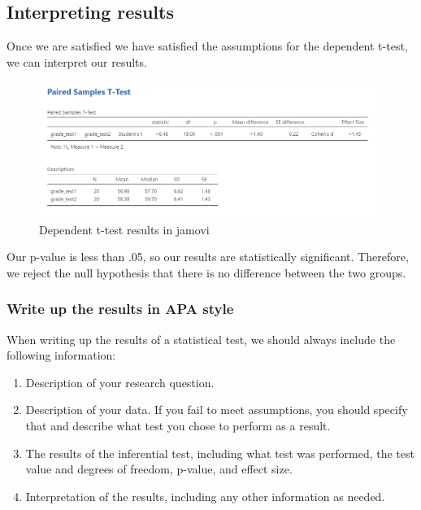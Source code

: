 \documentclass[
]{book}
\providecommand{\tightlist}{%
  \setlength{\itemsep}{0pt}\setlength{\parskip}{0pt}}
\begin{document}
\hypertarget{interpreting-results}{%
\subsection{Interpreting results}\label{interpreting-results}}

Once we are satisfied we have satisfied the assumptions for the dependent t-test, we can interpret our results.

\begin{figure}

{\centering \includegraphics[width=1\linewidth]{images/03_dependent_t-test/dependent_results} 

}

\caption{Dependent t-test results in jamovi}\label{fig:unnamed-chunk-7}
\end{figure}

Our p-value is less than .05, so our results are statistically significant. Therefore, we reject the null hypothesis that there is no difference between the two groups.

\hypertarget{write-up-the-results-in-apa-style-2}{%
\subsubsection{Write up the results in APA style}\label{write-up-the-results-in-apa-style-2}}

When writing up the results of a statistical test, we should always include the following information:

\begin{enumerate}
\def\labelenumi{\arabic{enumi}.}
\tightlist
\item
  Description of your research question.
\item
  Description of your data. If you fail to meet assumptions, you should specify that and describe what test you chose to perform as a result.
\item
  The results of the inferential test, including what test was performed, the test value and degrees of freedom, p-value, and effect size.
\item
  Interpretation of the results, including any other information as needed.
\end{enumerate}
\end{document}
